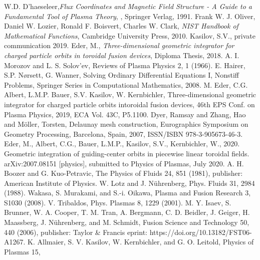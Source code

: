 \documentclass[./main.tex]{subfiles}
\begin{document}
\begin{thebibliography}{1}
	\label{chp:bibliography}
	 W.D. D'haeseleer,\textit{Flux Coordinates and Magnetic Field Structure - A Guide to a Fundamental Tool of Plasma Theory},
, Springer Verlag, 1991.
	 Frank W. J. Oliver, Daniel W. Lozier, Ronald F. Boisvert, Charles W. Clark, \textit{NIST Handbook of Mathematical Functions}, Cambridge University Press, 2010.
	 Kasilov, S.V., private communication 2019.
	 Eder, M., \textit{Three-dimensional geometric integrator
for charged particle orbits in toroidal fusion devices}, Diploma Thesis, 2018.
	 A. I. Morozov and L. S. Solov'ev, Reviews of Plasma Physics 2, 1 (1966).
	 E. Hairer, S.P. N{\o}rsett, G. Wanner, Solving Ordinary Differential Equations I, Nonstiff Problems, Springer Series in Computational Mathematics, 2008.
	 M. Eder, C.G. Albert, L.M.P. Bauer, S.V. Kasilov, W. Kernbichler, Three-dimensional geometric integrator for charged particle orbits intoroidal fusion devices, 46th EPS Conf. on Plasma Physics, 2019, ECA Vol. 43C, P5.1100.
	 Dyer, Ramsay and Zhang, Hao and Möller, Torsten, Delaunay mesh construction, Eurographics Symposium on Geometry Processing, Barcelona, Spain, 2007, ISSN/ISBN 978-3-905673-46-3. 
	 Eder, M., Albert, C.G., Bauer, L.M.P., Kasilov, S.V., Kernbichler, W., 2020. Geometric integration of guiding-center orbits in piecewise linear toroidal fields. arXiv:2007.08151 [physics], submitted to Physics of Plasmas, July 2020.
	 A. H. Boozer and G. Kuo-Petravic, The Physics of Fluids 24, 851 (1981), publisher: American Institute of Physics.
	 W. Lotz and J. N\"uhrenberg, Phys. Fluids 31, 2984 (1988).
	 Wakasa, S. Murakami, and S.-i. Oikawa, Plasma and Fusion Research 3, S1030 (2008).
	V. Tribaldos, Phys. Plasmas 8, 1229 (2001).
	M. Y. Isaev, S. Brunner, W. A. Cooper, T. M. Tran, A. Bergmann, C. D. Beidler, J. Geiger,
H. Maassberg, J. N\"uhrenberg, and M. Schmidt, Fusion Science and Technology 50, 440
(2006), publisher: Taylor \& Francis eprint: https://doi.org/10.13182/FST06-A1267.
	K. Allmaier, S. V. Kasilov, W. Kernbichler, and G. O. Leitold, Physics of Plasmas 15,

\end{thebibliography}
\end{document}
